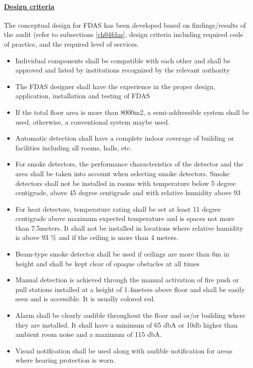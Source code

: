 \paragraph{\underline{Design criteria}}
The conceptual design for FDAS has been developed based on findings/results of the audit (refer to subsections \ref{ch04fdas}, design criteria including required code of practice, and the required level of services.
\begin{itemize}
\item Individual components shall be compatible with each other and shall be approved and listed by institutions recognized by the relevant authority
\item The FDAS designer shall have the experience in the proper design, application, installation and testing of FDAS
\item If the total floor area is more than 8000m2, a semi-addressible system shall be used, otherwise, a conventional system maybe used.
\item  Automatic detection shall have a complete indoor coverage of building or facilities including all rooms, halls, etc.
\item  For smoke detectors, the performance characteristics of the detector and the area shall be taken into account when selecting smoke detectors. Smoke detectors shall not be installed in rooms with temperature below 5 degree centigrade, above 45 degree centigrade and with relative humidity above 93%
\item  For heat detectors, temperature rating shall be set at least 11 degree centigrade above maximum expected temperature and is spaces not more than 7.5meters. It shall not be installed in locations where relative humidity is above 93 \% and if the ceiling is more than 4 meters.
\item  Beam-type smoke detector shall be used if ceilings are more than 6m in height and shall be kept clear of opaque obstacles at all times
\item  Manual detection is achieved through the manual activation of fire push or pull stations installed at a height of 1.4meters above floor and shall be easily seen and is accessible. It is usually colored red.
\item  Alarm shall be clearly audible throughout the floor and or/or building where they are installed. It shall have a minimum of 65 dbA or 10db higher than ambient room noise and a maximum of 115 dbA.
\item  Visual notification shall be used along with audible notification for areas where hearing protection is worn.
\end{itemize}

